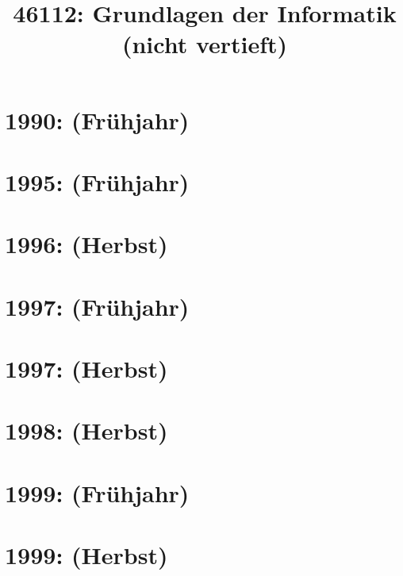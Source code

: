\documentclass{lehramt-informatik-haupt}
\title{46112: Grundlagen der Informatik (nicht vertieft)}
\begin{document}
\maketitle
\tableofcontents

\section{1990: (Frühjahr)}


\section{1995: (Frühjahr)}


\section{1996: (Herbst)}


\section{1997: (Frühjahr)}


\section{1997: (Herbst)}


\section{1998: (Herbst)}


\section{1999: (Frühjahr)}


\section{1999: (Herbst)}

\end{document}
